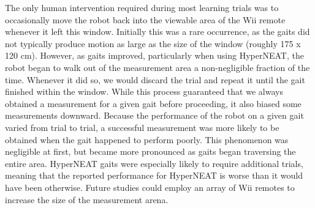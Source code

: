 


The only human intervention required during most learning trials was
to occasionally move the robot back into the viewable area of the Wii
remote whenever it left this window.  Initially this was a rare
occurrence, as the gaits did not typically produce motion as large as
the size of the window (roughly 175 x 120 cm).  However, as gaits
improved, particularly when using HyperNEAT, the robot began to walk
out of the measurement area a non-negligible fraction of the time.
Whenever it did so, we would discard the trial and repeat it until the
gait finished within the window. While this process guaranteed that we always obtained a measurement
for a given gait before proceeding, it also biased some measurements
downward.  Because the performance of the robot on a given gait varied
from trial to trial, a successful measurement was more likely to be
obtained when the gait happened to perform poorly.  This phenomenon
was negligible at first, but became more pronounced as gaits began traversing the entire
area.  HyperNEAT gaits were especially likely to require additional
trials, meaning that the reported performance for HyperNEAT is worse
than it would have been otherwise. Future studies could employ an
array of Wii remotes to increase the size of the measurement arena.
